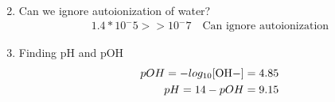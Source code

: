 \documentclass[../CHEM152Notes.tex]{subfiles}
\begin{document}
\begin{enumerate}
\begin{equation*}
\begin{aligned}
            \end{aligned}
        \end{equation*}
    \item Can we ignore autoionization of water?
        \begin{equation*}
            \begin{aligned}
                1.4*10^-5 >> 10^-7 \quad \text{Can ignore autoionization}
            \end{aligned}
        \end{equation*}
    \item Finding pH and pOH
        \begin{equation*}
            \begin{aligned}
                pOH = -log_{10}\ce{[OH-]} = 4.85 \\
                pH = 14 - pOH = 9.15
            \end{aligned}
        \end{equation*}
\end{enumerate}
\end{document}
